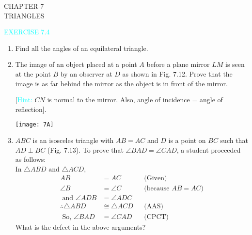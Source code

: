 \documentclass {article}
\begin{document}
\begin{center}
	{\Large CHAPTER-7\\\vspace{0.2cm} TRIANGLES}
\end{center}

\textcolor{cyan}{\large EXERCISE 7.4}

\begin {enumerate}
\item Find all the angles of an equilateral triangle.
\item The image of an object placed at a point $A$ before a plane mirror $LM$ is seen at the point $B$ by an observer at $D$ as shown in Fig. 7.12. Prove that the image is as far behind the mirror as the object is in front  of the mirror.

[\textcolor{cyan}{Hint:} $CN$ is normal to the mirror. Also, angle of incidence = angle of reflection].
\begin{center}
\texttt{[image: 7A]}
\end{center}
\item $ABC$ is an isosceles triangle with $AB = AC$ and $D$ is a point on $BC$ such that $AD\perp  BC$ (Fig. 7.13). To prove that $\angle BAD = \angle CAD$, a student proceeded as follows:\\
In $\triangle  ABD \text{ and }\triangle  ACD$,
\begin{align*}
AB &= AC &&\text{(Given)}\\
\angle B &= \angle C &&\text{(because $AB = AC$)}\\
\text{ and }
\angle ADB &= \angle ADC\\
\therefore \triangle  ABD &\cong  \triangle ACD &&\text {(AAS)} \\
\text { So, }  \angle BAD &= \angle CAD &&\text{(CPCT)}
\end{align*}
What is the defect in the above arguments?


\end{enumerate}
\end{document}

